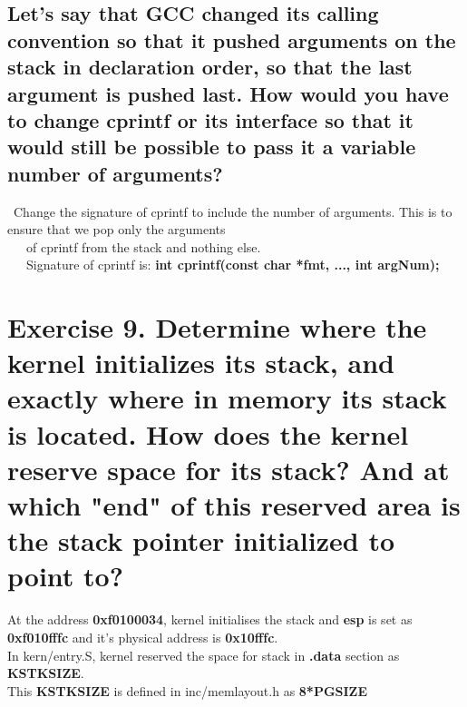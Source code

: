\documentclass[a4paper]{article}
\begin{document}
		 \subsection{Let's say that GCC changed its calling convention so that it pushed arguments on the stack in declaration order, so that the last argument is pushed last. How would you have to change cprintf or its interface so that it would still be possible to pass it a variable number of arguments?}
		 \qquad \textbullet \quad ~Change the signature of cprintf to include the number of arguments. This is to ensure that we pop only the arguments\\ \qquad\quad ~~~of cprintf from the stack and nothing else. \\
		 \qquad \quad ~~~Signature of cprintf is: \textbf{int cprintf(const char *fmt, ..., int argNum);}
		 \vspace{\baselineskip}
	\section{Exercise 9. Determine where the kernel initializes its stack, and exactly where in memory its stack is located. How does the kernel reserve space for its stack? And at which "end" of this reserved area is the stack pointer initialized to point to?}
	\textbullet \quad At the address \textbf{0xf0100034}, kernel initialises the stack and \textbf{esp} is set as \textbf{0xf010fffc} and it's physical address is \textbf{0x10fffc}. \\
	\textbullet \quad In kern/entry.S, kernel reserved the space for stack in \textbf{.data} section as \textbf{KSTKSIZE}.\\
	\textbullet \quad This \textbf{KSTKSIZE} is defined in inc/memlayout.h as \textbf{8*PGSIZE}
\end{document}
